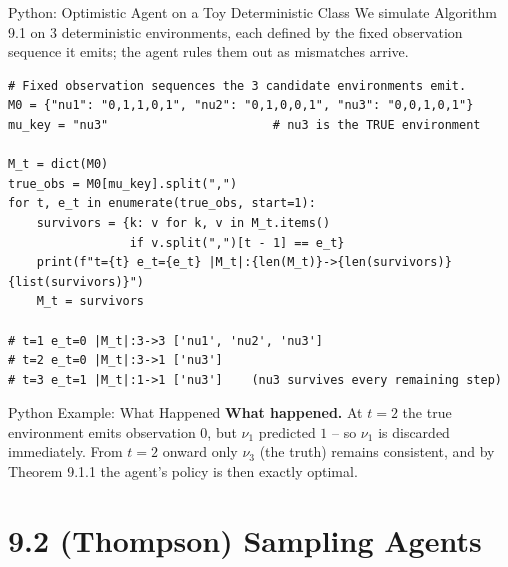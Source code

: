 \documentclass[aspectratio=169,10pt]{beamer}
\begin{document}
\begin{frame}[fragile]{Python: Optimistic Agent on a Toy Deterministic Class}
  We simulate Algorithm 9.1 on $3$ deterministic environments, each defined
  by the fixed observation sequence it emits; the agent rules them out as
  mismatches arrive.
  \begin{lstlisting}[style=pycode]
# Fixed observation sequences the 3 candidate environments emit.
M0 = {"nu1": "0,1,1,0,1", "nu2": "0,1,0,0,1", "nu3": "0,0,1,0,1"}
mu_key = "nu3"                       # nu3 is the TRUE environment

M_t = dict(M0)
true_obs = M0[mu_key].split(",")
for t, e_t in enumerate(true_obs, start=1):
    survivors = {k: v for k, v in M_t.items()
                 if v.split(",")[t - 1] == e_t}
    print(f"t={t} e_t={e_t} |M_t|:{len(M_t)}->{len(survivors)} {list(survivors)}")
    M_t = survivors

# t=1 e_t=0 |M_t|:3->3 ['nu1', 'nu2', 'nu3']
# t=2 e_t=0 |M_t|:3->1 ['nu3']
# t=3 e_t=1 |M_t|:1->1 ['nu3']    (nu3 survives every remaining step)
  \end{lstlisting}
\end{frame}

\begin{frame}{Python Example: What Happened}
  \textbf{What happened.} At $t=2$ the true environment emits observation
  $0$, but $\nu_1$ predicted $1$ -- so $\nu_1$ is discarded immediately.
  From $t=2$ onward only $\nu_3$ (the truth) remains consistent, and by
  Theorem 9.1.1 the agent's policy is then exactly optimal.
\end{frame}

\section{9.2 (Thompson) Sampling Agents}
\end{document}
